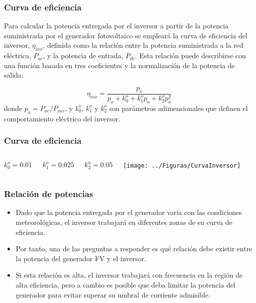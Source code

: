 \documentclass[serif, xcolor=dvipsnames]{beamer}
\begin{document}
\begin{frame}
  \frametitle{Curva de eficiencia}

  Para calcular la potencia entregada por el inversor a partir de la
  potencia suministrada por el generador fotovoltaico se empleará la
  curva de eficiencia del inversor, $\eta_{inv}$, definida como la
  relación entre la potencia suministrada a la red eléctrica,
  $P_{ac}$, y la potencia de entrada, $P_{dc}$. Esta relación puede
  describirse con una función basada en tres coeficientes y la
  normalización de la potencia de salida:

\[
\eta_{inv}=\frac{p_{o}}{p_{o}+k_{0}^{o}+k_{1}^{o}p_{o}+k_{2}^{o}p_{o}^{2}}\]
donde $p_{o}=P_{ac}/P_{inv}$, y $k_{0}^{o}$, $k_{1}^{o}$ y $k_{2}^{o}$
son parámetros adimensionales que definen el comportamiento eléctrico
del inversor.


\end{frame}
\begin{frame}
  \frametitle{Curva de eficiencia}
  \begin{columns}[c]%


    \column{3cm}

    $k_{0}^{o}=0.01$

    $k_{1}^{o}=0.025$

    $k_{2}^{o}=0.05$


    \column{7cm}

    \begin{center}
      \texttt{[image: ../Figuras/CurvaInversor]}
      \par\end{center}

  \end{columns}%

\end{frame}
\begin{frame}
  \frametitle{Relación de potencias}
  \begin{itemize}
  \item Dado que la potencia entregada por el generador varía con las
    condiciones meteorológicas, el inversor trabajará en diferentes
    zonas de su curva de eficiencia.
  \item Por tanto, una de las preguntas a responder es qué relación
    debe existir entre la potencia del generador FV y el inversor.
  \item Si esta relación es alta, el inversor trabajará con frecuencia
    en la región de alta eficiencia, pero a cambio es posible que deba
    limitar la potencia del generador para evitar superar su umbral de
    corriente admisible.
  \end{itemize}

\end{frame}
\end{document}

